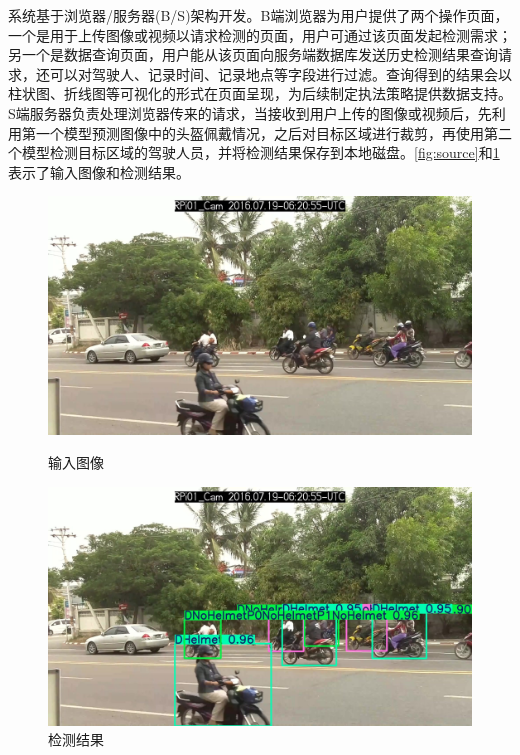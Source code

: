 系统基于浏览器/服务器(B/S)架构开发。B端浏览器为用户提供了两个操作页面，一个是用于上传图像或视频以请求检测的页面，用户可通过该页面发起检测需求；另一个是数据查询页面，用户能从该页面向服务端数据库发送历史检测结果查询请求，还可以对驾驶人、记录时间、记录地点等字段进行过滤。查询得到的结果会以柱状图、折线图等可视化的形式在页面呈现，为后续制定执法策略提供数据支持。S端服务器负责处理浏览器传来的请求，当接收到用户上传的图像或视频后，先利用第一个模型预测图像中的头盔佩戴情况，之后对目标区域进行裁剪，再使用第二个模型检测目标区域的驾驶人员，并将检测结果保存到本地磁盘。\ref{fig:source}和\ref{fig:result}表示了输入图像和检测结果。

\begin{figure}[!htb]
  \centering
  \begin{minipage}{0.45\textwidth} %
      \centering
      \includegraphics[width=\textwidth]{figs/chap01/source.jpg}
      \caption{输入图像}
      \label{fig:source}
  \end{minipage}
  \hfill %
  \begin{minipage}{0.45\textwidth}
      \centering
      \includegraphics[width=\textwidth]{figs/chap01/result.png}
      \caption{检测结果}
      \label{fig:result}
  \end{minipage}
\end{figure}


